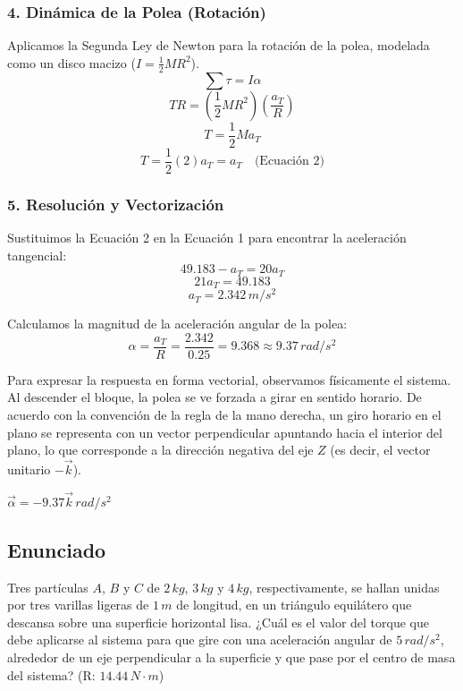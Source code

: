 \documentclass[12pt, a4paper]{article}
\begin{document}
\subsubsection*{4. Dinámica de la Polea (Rotación)}
Aplicamos la Segunda Ley de Newton para la rotación de la polea, modelada como un disco macizo ($I = \frac{1}{2} M R^2$).
$$\sum \tau = I \alpha$$
$$T R = \left( \frac{1}{2} M R^2 \right) \left( \frac{a_T}{R} \right)$$
$$T = \frac{1}{2} M a_T$$
$$T = \frac{1}{2} (2) a_T = a_T \quad \text{(Ecuación 2)}$$

\subsubsection*{5. Resolución y Vectorización}
Sustituimos la Ecuación 2 en la Ecuación 1 para encontrar la aceleración tangencial:
$$49.183 - a_T = 20 a_T$$
$$21 a_T = 49.183$$
$$a_T = 2.342 \, \si{m/s^2}$$

Calculamos la magnitud de la aceleración angular de la polea:
$$\alpha = \frac{a_T}{R} = \frac{2.342}{0.25} = 9.368 \approx 9.37 \, \si{rad/s^2}$$

Para expresar la respuesta en forma vectorial, observamos físicamente el sistema. Al descender el bloque, la polea se ve forzada a girar en sentido horario. De acuerdo con la convención de la regla de la mano derecha, un giro horario en el plano se representa con un vector perpendicular apuntando hacia el interior del plano, lo que corresponde a la dirección negativa del eje $Z$ (es decir, el vector unitario $-\vec{k}$).

\begin{tcolorbox}[colback=green!5!white, colframe=green!50!black, title=Respuesta Final]
\centering \Large $\vec{\alpha} = -9.37 \vec{k} \, \si{rad/s^2}$
\end{tcolorbox}

\newpage

\subsection*{Enunciado}
Tres partículas $A$, $B$ y $C$ de $2 \, \si{kg}$, $3 \, \si{kg}$ y $4 \, \si{kg}$, respectivamente, se hallan unidas por tres varillas ligeras de $1 \, \si{m}$ de longitud, en un triángulo equilátero que descansa sobre una superficie horizontal lisa. ¿Cuál es el valor del torque que debe aplicarse al sistema para que gire con una aceleración angular de $5 \, \si{rad/s^2}$, alrededor de un eje perpendicular a la superficie y que pase por el centro de masa del sistema? (R: $14.44 \, \si{N\cdot m}$)
\end{document}
